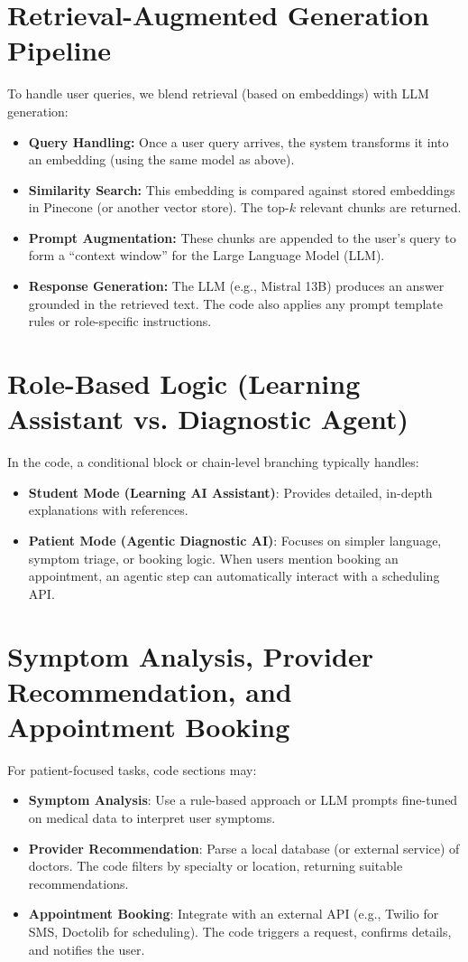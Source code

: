 \section{Retrieval-Augmented Generation Pipeline}
\label{sec:rag-pipeline}
To handle user queries, we blend retrieval (based on embeddings) with LLM generation:
\begin{itemize}
    \item \textbf{Query Handling:} Once a user query arrives, the system transforms it into an embedding (using the same model as above).
    \item \textbf{Similarity Search:} This embedding is compared against stored embeddings in Pinecone (or another vector store). The top-$k$ relevant chunks are returned.
    \item \textbf{Prompt Augmentation:} These chunks are appended to the user’s query to form a “context window” for the Large Language Model (LLM).
    \item \textbf{Response Generation:} The LLM (e.g., Mistral 13B) produces an answer grounded in the retrieved text. The code also applies any prompt template rules or role-specific instructions.
\end{itemize}

\section{Role-Based Logic (Learning Assistant vs. Diagnostic Agent)}
\label{sec:role-logic}
In the code, a conditional block or chain-level branching typically handles:
\begin{itemize}
    \item \textbf{Student Mode (Learning AI Assistant)}:  
    Provides detailed, in-depth explanations with references.
    \item \textbf{Patient Mode (Agentic Diagnostic AI)}:  
    Focuses on simpler language, symptom triage, or booking logic. 
    When users mention booking an appointment, an agentic step can automatically interact with a scheduling API.
\end{itemize}

\section{Symptom Analysis, Provider Recommendation, and Appointment Booking}
\label{sec:extended-capabilities}
For patient-focused tasks, code sections may:
\begin{itemize}
    \item \textbf{Symptom Analysis}: Use a rule-based approach or LLM prompts fine-tuned on medical data to interpret user symptoms.
    \item \textbf{Provider Recommendation}: Parse a local database (or external service) of doctors. The code filters by specialty or location, returning suitable recommendations.
    \item \textbf{Appointment Booking}: Integrate with an external API (e.g., Twilio for SMS, Doctolib for scheduling). The code triggers a request, confirms details, and notifies the user.
\end{itemize}

